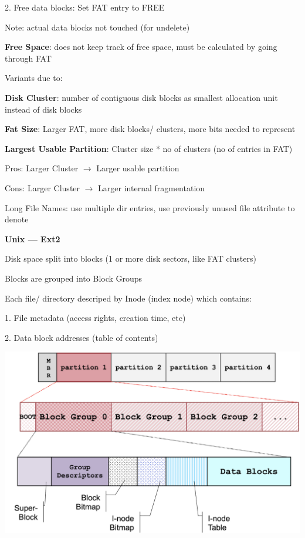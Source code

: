 \documentclass[10pt, a4paper]{article}
\newcommand{\blue}[1]{{\color{MidnightBlue}#1}}
\newcommand{\red}[1]{{\color{red}#1}}
\newcommand{\green}[1]{{\color{ForestGreen}#1}}
\newcommand{\tab}[0]{\hspace*{2mm}}
\begin{document}
\begin{multicols*}{3}
		2. Free data blocks: Set FAT entry to FREE

		\tab{} \red{Note}: actual data blocks not touched (for undelete)

		\textbf{Free Space}: does not keep track of free space, must be calculated by going through FAT

		Variants due to:

		\textbf{Disk Cluster}: number of contiguous disk blocks as smallest allocation unit instead of disk blocks

		\textbf{Fat Size}: Larger FAT, more disk blocks/ clusters, more bits needed to represent

		\textbf{Largest Usable Partition}: Cluster size * no of clusters (no of entries in FAT)

		\green{Pros}: Larger Cluster $\rightarrow$ Larger usable partition

		\red{Cons}: Larger Cluster $\rightarrow$ Larger internal fragmentation

		Long File Names: use multiple dir entries, use previously unused file attribute to denote

		\textbf{Unix --- Ext2}

		Disk space split into \blue{blocks} (1 or more disk sectors, like FAT clusters)

		Blocks are grouped into \blue{Block Groups}

		Each file/ directory descriped by \blue{Inode} (index node) which contains:

		1. File metadata (access rights, creation time, etc)

		2. Data block addresses (table of contents)

		\includegraphics*[scale=0.18]{./assets/ext2Partition.png}


\end{multicols*}
\end{document}
